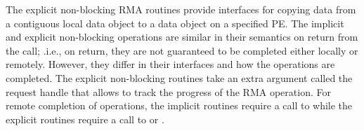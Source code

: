 The explicit non-blocking RMA routines provide interfaces for copying
data from a contiguous local data object to a data object on a specified
PE. The implicit and explicit non-blocking operations are similar in
their semantics on return from the call; .i.e., on return, they are not
guaranteed to be completed either locally or remotely. However, they
differ in their interfaces and how the operations are completed. The
explicit non-blocking routines take an extra argument called the request
handle that allows to track the progress of the RMA operation.
For remote completion of operations, the implicit routines require a call to
 while the explicit routines require a call to
 or .
